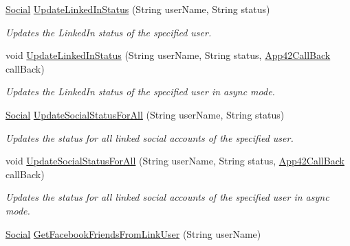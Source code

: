 \begin{DoxyCompactItemize}
\hyperlink{classcom_1_1shephertz_1_1app42_1_1paas_1_1sdk_1_1csharp_1_1social_1_1_social}{Social} \hyperlink{classcom_1_1shephertz_1_1app42_1_1paas_1_1sdk_1_1csharp_1_1social_1_1_social_service_a23d5417f23c196110dcb9f25c52afeb4}{Update\+Linked\+In\+Status} (String user\+Name, String status)
\begin{DoxyCompactList}\small\item\em Updates the Linked\+In status of the specified user. \end{DoxyCompactList}\item 
void \hyperlink{classcom_1_1shephertz_1_1app42_1_1paas_1_1sdk_1_1csharp_1_1social_1_1_social_service_a9bd9801060f8a38a484be1f00ac619de}{Update\+Linked\+In\+Status} (String user\+Name, String status, \hyperlink{interfacecom_1_1shephertz_1_1app42_1_1paas_1_1sdk_1_1csharp_1_1_app42_call_back}{App42\+Call\+Back} call\+Back)
\begin{DoxyCompactList}\small\item\em Updates the Linked\+In status of the specified user in async mode. \end{DoxyCompactList}\item 
\hyperlink{classcom_1_1shephertz_1_1app42_1_1paas_1_1sdk_1_1csharp_1_1social_1_1_social}{Social} \hyperlink{classcom_1_1shephertz_1_1app42_1_1paas_1_1sdk_1_1csharp_1_1social_1_1_social_service_a022c489055b0243b32d0b48baf3f22e5}{Update\+Social\+Status\+For\+All} (String user\+Name, String status)
\begin{DoxyCompactList}\small\item\em Updates the status for all linked social accounts of the specified user. \end{DoxyCompactList}\item 
void \hyperlink{classcom_1_1shephertz_1_1app42_1_1paas_1_1sdk_1_1csharp_1_1social_1_1_social_service_ace0b4ce2aba54d8e5cf2a90e60c7c0bc}{Update\+Social\+Status\+For\+All} (String user\+Name, String status, \hyperlink{interfacecom_1_1shephertz_1_1app42_1_1paas_1_1sdk_1_1csharp_1_1_app42_call_back}{App42\+Call\+Back} call\+Back)
\begin{DoxyCompactList}\small\item\em Updates the status for all linked social accounts of the specified user in async mode. \end{DoxyCompactList}\item 
\hyperlink{classcom_1_1shephertz_1_1app42_1_1paas_1_1sdk_1_1csharp_1_1social_1_1_social}{Social} \hyperlink{classcom_1_1shephertz_1_1app42_1_1paas_1_1sdk_1_1csharp_1_1social_1_1_social_service_aa020087b856c02340e5618471db5e9fd}{Get\+Facebook\+Friends\+From\+Link\+User} (String user\+Name)

\end{DoxyCompactItemize}
